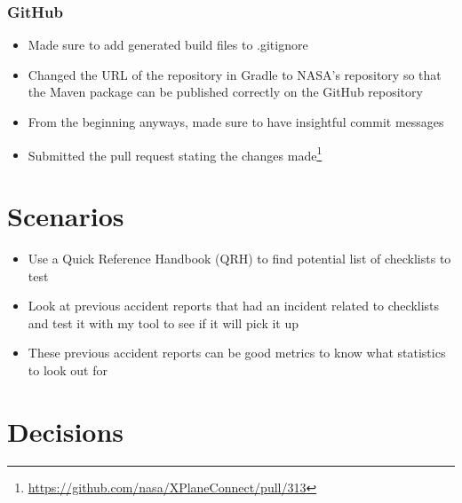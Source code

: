 \documentclass[../dissertation.tex]{subfiles}
\begin{document}
\subsubsection{GitHub}
\begin{itemize}
  \item Made sure to add generated build files to .gitignore
  \item Changed the URL of the repository in Gradle to NASA's repository so that
    the Maven package can be published correctly on the GitHub repository
  \item From the beginning anyways, made sure to have insightful commit messages
  \item Submitted the pull request stating the changes made\footnote{\url{https://github.com/nasa/XPlaneConnect/pull/313}}
\end{itemize}



\section{Scenarios}
\begin{itemize}
  \item Use a Quick Reference Handbook (QRH) to find potential list of checklists to test
  \item Look at previous accident reports that had an incident related to checklists
    and test it with my tool to see if it will pick it up
  \item These previous accident reports can be good metrics to know what statistics to
    look out for
\end{itemize}


\section{Decisions}
\end{document}
